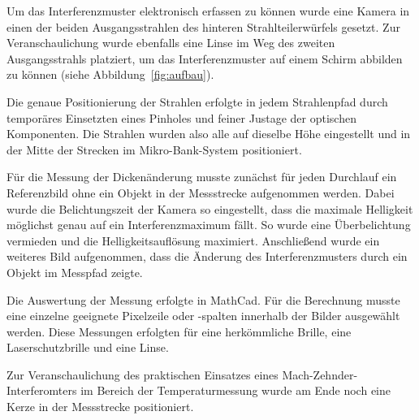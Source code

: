 Um das Interferenzmuster elektronisch erfassen zu können wurde eine Kamera in einen der beiden Ausgangsstrahlen des hinteren Strahlteilerwürfels gesetzt. Zur Veranschaulichung wurde ebenfalls eine Linse im Weg des zweiten Ausgangsstrahls platziert, um das Interferenzmuster auf einem Schirm abbilden zu können (siehe Abbildung~\ref{fig:aufbau}).

Die genaue Positionierung der Strahlen erfolgte in jedem Strahlenpfad durch temporäres Einsetzten eines Pinholes und feiner Justage der optischen Komponenten. Die Strahlen wurden also alle auf dieselbe Höhe eingestellt und in der Mitte der Strecken im Mikro-Bank-System positioniert.

Für die Messung der Dickenänderung musste zunächst für jeden Durchlauf ein Referenzbild ohne ein Objekt in der Messstrecke aufgenommen werden. Dabei wurde die Belichtungszeit der Kamera so eingestellt, dass die maximale Helligkeit möglichst genau auf ein Interferenzmaximum fällt. So wurde eine Überbelichtung vermieden und die Helligkeitsauflösung maximiert. Anschließend wurde ein weiteres Bild aufgenommen, dass die Änderung des Interferenzmusters durch ein Objekt im Messpfad zeigte. 

Die Auswertung der Messung erfolgte in MathCad. Für die Berechnung musste eine einzelne geeignete Pixelzeile oder -spalten innerhalb der Bilder ausgewählt werden. Diese Messungen erfolgten für eine herkömmliche Brille, eine Laserschutzbrille und eine Linse.

Zur Veranschaulichung des praktischen Einsatzes eines Mach-Zehnder-Interferomters im Bereich der Temperaturmessung wurde am Ende noch eine Kerze in der Messstrecke positioniert.